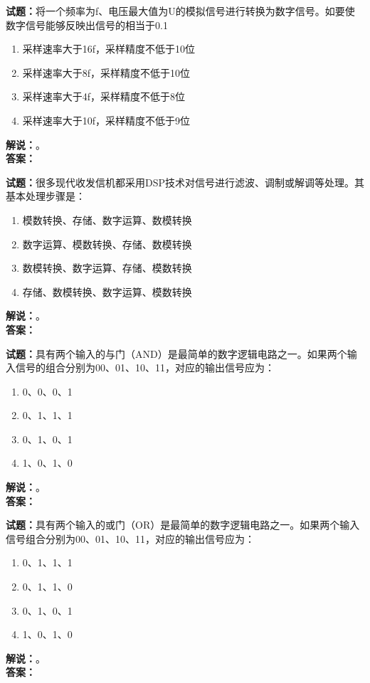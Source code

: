 \documentclass{ctexbook}
\begin{document}
\bigskip

\noindent\textbf{试题：}将一个频率为f、电压最大值为U的模拟信号进行转换为数字信号。如要使数字信号能够反映出信号的相当于0.1%
\begin{enumerate}[leftmargin=3em]
  \item 采样速率大于16f，采样精度不低于10位
  \item 采样速率大于8f，采样精度不低于10位
  \item 采样速率大于4f，采样精度不低于8位
  \item 采样速率大于10f，采样精度不低于9位
\end{enumerate}
\noindent\textbf{解说：}\textbf{}。\\\noindent\textbf{答案：}

\bigskip

\noindent\textbf{试题：}很多现代收发信机都采用DSP技术对信号进行滤波、调制或解调等处理。其基本处理步骤是：
\begin{enumerate}[leftmargin=3em]
  \item 模数转换、存储、数字运算、数模转换
  \item 数字运算、模数转换、存储、数模转换
  \item 数模转换、数字运算、存储、模数转换
  \item 存储、数模转换、数字运算、模数转换
\end{enumerate}
\noindent\textbf{解说：}\textbf{}。\\\noindent\textbf{答案：}

\bigskip

\noindent\textbf{试题：}具有两个输入的与门（AND）是最简单的数字逻辑电路之一。如果两个输入信号的组合分别为00、01、10、11，对应的输出信号应为：
\begin{enumerate}[leftmargin=3em]
  \item 0、0、0、1
  \item 0、1、1、1
  \item 0、1、0、1
  \item 1、0、1、0
\end{enumerate}
\noindent\textbf{解说：}\textbf{}。\\\noindent\textbf{答案：}

\bigskip

\noindent\textbf{试题：}具有两个输入的或门（OR）是最简单的数字逻辑电路之一。如果两个输入信号组合分别为00、01、10、11，对应的输出信号应为：
\begin{enumerate}[leftmargin=3em]
  \item 0、1、1、1
  \item 0、1、1、0
  \item 0、1、0、1
  \item 1、0、1、0
\end{enumerate}
\noindent\textbf{解说：}\textbf{}。\\\noindent\textbf{答案：}
\end{document}

